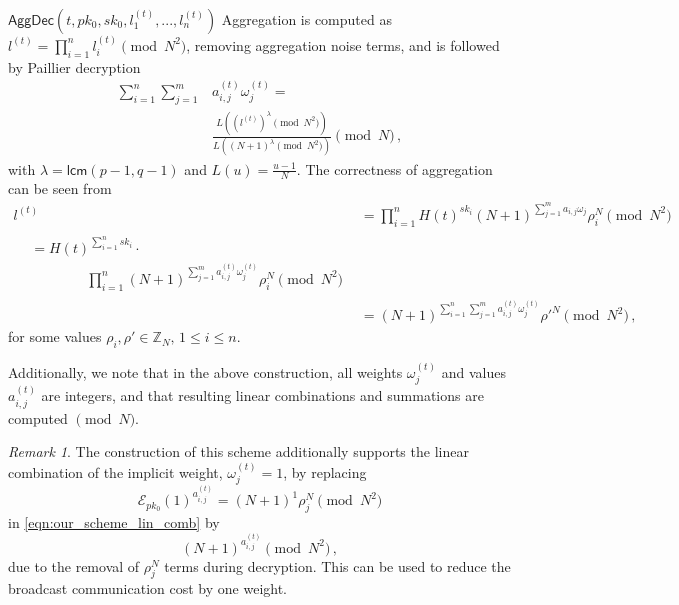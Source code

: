 \documentclass[10pt,letterpaper,oneside,twocolumn,journal]{IEEEtran}
\theoremstyle{definition}
\theoremstyle{definition}
\theoremstyle{remark}
\newtheorem*{remark}{Remark}
\newcommand\shrtdots{\!...}
\begin{document}
\begin{LaTeXdescription}
    \item[$\mathsf{AggDec}(t, pk_0, sk_0, l^{(t)}_1,\shrtdots,l^{(t)}_n)$] Aggregation is computed as $l^{(t)} = \prod^n_{i=1}l^{(t)}_i \pmod{N^2}$, removing aggregation noise terms, and is followed by Paillier decryption
    \begin{equation}
        \begin{split}
            \sum^{n}_{i=1}\sum^{m}_{j=1}&a^{(t)}_{i,j}\omega^{(t)}_j =\\
            &\frac{L((l^{(t)})^\lambda\pmod{N^2})}{L((N+1)^\lambda\pmod{N^2})} \pmod{N}\,,
        \end{split} \label{eqn:our_scheme_decrypt}
    \end{equation}
    with $\lambda = \mathsf{lcm}(p-1, q-1)$ and $L(u) = \frac{u-1}{N}$. The correctness of aggregation can be seen from
    \begin{align*}
        l^{(t)} &= \prod^n_{i=1}H(t)^{sk_i}(N+1)^{\sum^{m}_{j=1}a_{i,j}\omega_j}\rho_i^N \pmod{N^2} \\
        \begin{split}
            &= H(t)^{\sum^n_{i=1}sk_i}\cdot \\
            &\qquad\qquad \prod^n_{i=1}(N+1)^{\sum^{m}_{j=1}a^{(t)}_{i,j}\omega^{(t)}_j}\rho_i^N \pmod{N^2}
        \end{split}\\
        &= (N+1)^{\sum^n_{i=1}\sum^{m}_{j=1}a^{(t)}_{i,j}\omega^{(t)}_j}\rho'^N \pmod{N^2}\,,
    \end{align*}
    for some values $\rho_i,\rho' \in \mathbb{Z}_N,\,1\leq i \leq n$.
\end{LaTeXdescription}

Additionally, we note that in the above construction, all weights $\omega^{(t)}_j$ and values $a^{(t)}_{i,j}$ are integers, and that resulting linear combinations and summations are computed $\pmod{N}$.

\begin{remark} \label{rem:lcao_implicit_weight}
    The construction of this scheme additionally supports the linear combination of the implicit weight, $\omega^{(t)}_j = 1$, by replacing
    \begin{equation}
        \mathcal{E}_{pk_0}(1)^{a^{(t)}_{i,j}} = (N+1)^{1}\rho_j^N \pmod{N^2}
    \end{equation}
    in \eqref{eqn:our_scheme_lin_comb} by
    \begin{equation}
        (N+1)^{a^{(t)}_{i,j}} \pmod{N^2}\,,
    \end{equation}
    due to the removal of $\rho_j^N$ terms during decryption. This can be used to reduce the broadcast communication cost by one weight.
\end{remark}
\end{document}
